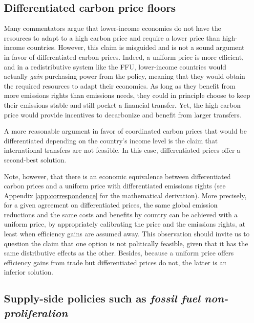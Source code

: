 \documentclass[12pt,english]{article}
\begin{document}
\subsection{Differentiated carbon price floors}

Many commentators argue that lower-income economies do not have the resources to adapt to a high carbon price and require a lower price than high-income countries. However, this claim is misguided and is not a sound argument in favor of differentiated carbon prices.\citep{aldy_promise_2012} Indeed, a uniform price is more efficient, and in a redistributive system like the FFU, lower-income countries would actually \textit{gain} purchasing power from the policy, meaning that they would obtain the required resources to adapt their economies. As long as they benefit from more emissions rights than emissions needs, they could in principle choose to keep their emissions stable and still pocket a financial transfer. Yet, the high carbon price would provide incentives to decarbonize and benefit from larger transfers. 

A more reasonable argument in favor of coordinated carbon prices that would be differentiated depending on the country's income level\citep{parry_proposal_2021} is the claim that international transfers are not feasible. In this case, differentiated prices offer a second-best solution. 

Note, however, that there is an economic equivalence between differentiated carbon prices and a uniform price with differentiated emissions rights (see Appendix \ref{app:correspondence} for the mathematical derivation). More precisely, for a given agreement on differentiated prices, the same global emission reductions and the same costs and benefits by country can be achieved with a uniform price, by appropriately calibrating the price and the emissions rights, at least when efficiency gains are assumed away. This observation should invite us to question the claim that one option is not politically feasible, given that it has the same distributive effects as the other. Besides, because a uniform price offers efficiency gains from trade but differentiated prices do not, the latter is an inferior solution.

\subsection{Supply-side policies such as \textit{fossil fuel non-proliferation}}
\end{document}

